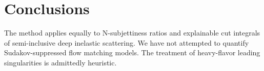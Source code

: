 \section{Conclusions}\label{sec:conclusions}

The method applies equally to N-subjettiness ratios and explainable cut
integrals of semi-inclusive deep inelastic scattering. We have not
attempted to quantify Sudakov-suppressed flow matching models. The
treatment of heavy-flavor leading singularities is admittedly heuristic.

